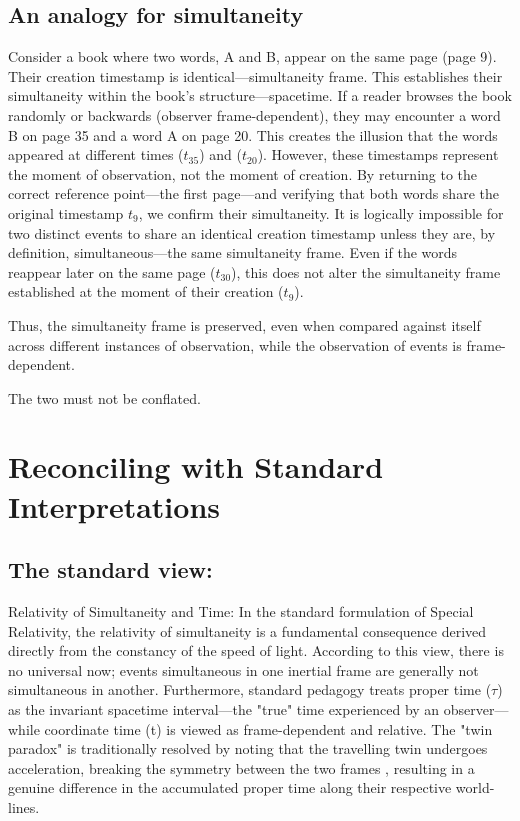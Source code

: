 \documentclass[pdflatex,sn-basic]{sn-jnl}
\theoremstyle{thmstyleone}%
\theoremstyle{thmstyletwo}%
\theoremstyle{thmstylethree}%
\begin{document}
	\subsection{An analogy for simultaneity}\label{subsec4_6}
	Consider a book where two words, A and B, appear on the same page (page 9). Their creation timestamp is identical—simultaneity frame. This establishes their simultaneity within the book's structure—spacetime. 
	If a reader browses the book randomly or backwards (observer frame-dependent), they may encounter a word B on page 35 and a word A on page 20. This creates the illusion that the words appeared at different times ($t_{35}$) and ($t_{20}$). However, these timestamps represent the moment of observation, not the moment of creation. By returning to the correct reference point—the first page—and verifying that both words share the original timestamp $t_9$, we confirm their simultaneity. It is logically impossible for two distinct events to share an identical creation timestamp unless they are, by definition, simultaneous—the same simultaneity frame. Even if the words reappear later on the same page ($t_{30}$), this does not alter the simultaneity frame established at the moment of their creation ($t_9$).

Thus, the simultaneity frame is preserved, even when compared against itself across different instances of observation, while the observation of events is frame-dependent.

The two must not be conflated.

\section{Reconciling with Standard Interpretations}\label{sec5}
	\subsection{The standard view:}\label{subsec5_1}
	Relativity of Simultaneity and Time: In the standard formulation of Special Relativity, the relativity of simultaneity is a fundamental consequence derived directly from the constancy of the speed of light. According to this view, there is no universal now; events simultaneous in one inertial frame are generally not simultaneous in another. Furthermore, standard pedagogy treats proper time ($\tau$) as the invariant spacetime interval—the "true" time experienced by an observer—while coordinate time (t) is viewed as frame-dependent and relative. The "twin paradox" is traditionally resolved by noting that the travelling twin undergoes acceleration, breaking the symmetry between the two frames \cite{taylor1992}, resulting in a genuine difference in the accumulated proper time along their respective world-lines.
\end{document}
